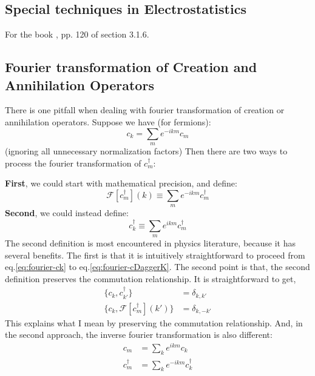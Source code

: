 \subsection{Special techniques in Electrostatistics}
\label{sec:Special-techniques-in-Electrostatistics}

For the book \cite{griffiths-EM}, pp. 120 of section 3.1.6. 
\subsection{Fourier transformation of Creation and Annihilation
Operators}
\label{sec:Fourier-CreationAnnihilation}
There is one pitfall when dealing with fourier transformation of creation or
annihilation operators. Suppose we have (for fermions):
\begin{equation}
    c_k = \sum_m e^{-ikm} c_m
    \label{eq:fourier-ck}
\end{equation}
(ignoring all unnecessary normalization factors)
Then there are two ways to process the fourier transformation of $c^\dagger_m$:

\textbf{First}, we could start with mathematical precision, and define:
\begin{equation}
    \mathcal{F}[c^\dagger_m](k) \equiv \sum_m e^{-ikm}c^\dagger_m
\end{equation}
\textbf{Second}, we could instead define:
\begin{equation}
    c^\dagger_k \equiv \sum_m e^{ikm} c^\dagger_m
    \label{eq:fourier-cDaggerK}
\end{equation}
The second definition is most encountered in physics literature, because it has
several benefits. The first is that it is intuitively straightforward to proceed
from eq.\ref{eq:fourier-ck} to eq.\ref{eq:fourier-cDaggerK}. The second point is
that, the second definition preserves the commutation relationship. It is
straightforward to get,
\begin{align}
    \{c_k,c^\dagger_{k'}\} &= \delta_{k,k'} \\
    \{c_k,\mathcal{F}[c^\dagger_m](k')\} &= \delta_{k,-k'}
    \label{eq:anticom-ckfck}
\end{align}
This explains what I mean by preserving the commutation relationship.
And, in the second approach, the inverse fourier transformation is also
different:
\begin{align}
    c_m &= \sum_k e^{ikm} c_k \\
    c^\dagger_m &= \sum_k e^{-ikm} c^\dagger_k
\end{align}

